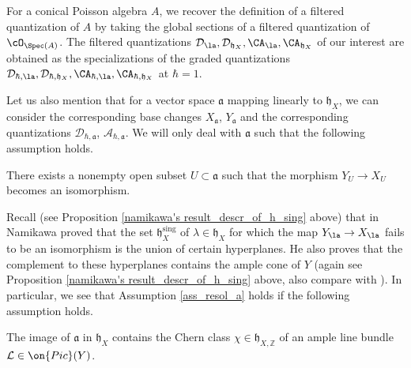 \documentclass[12pt]{amsart}
\begin{document}
For a conical Poisson algebra $A$, we recover the definition of a filtered quantization of $A$ by taking the global sections of a filtered quantization of $\cO_{\Spec(A)}$. The filtered quantizations $\mathcal{D}_\la, \mathcal{D}_{\mathfrak{h}_X}, \CA_\la, \CA_{\mathfrak{h}_X}$ of our interest are obtained as the specializations of the graded quantizations $\mathcal{D}_{\hbar, \la}, \mathcal{D}_{\hbar, \mathfrak{h}_X}, \CA_{\hbar, \la}, \CA_{\hbar, \mathfrak{h}_X}$ at $\hbar=1$. 




Let us also mention that for a vector space $\mathfrak{a}$ mapping linearly to $\mathfrak{h}_{X}$, we can consider the corresponding base changes $X_{\mathfrak{a}}$, $Y_{\mathfrak{a}}$ and the corresponding quantizations $\mathcal{D}_{\hbar,\mathfrak{a}}$, $\mathcal{A}_{\hbar,\mathfrak{a}}$. We will only deal with $\mathfrak{a}$ such that the following assumption holds.

\begin{assumption}\label{ass_resol_a}
There exists a nonempty open subset $U \subset \mathfrak{a}$ such that the morphism $Y_{U} \rightarrow X_{U}$ becomes an isomorphism. 
\end{assumption}



Recall (see Proposition \ref{namikawa's result_descr_of_h_sing} above) that in \cite[Main Theorem]{Namikawa_bir} Namikawa proved that the set $\mathfrak{h}_X^{\mathrm{sing}}$ of $\lambda \in \mathfrak{h}_X$ for which the map $Y_\la \rightarrow X_\la$ fails to be an isomorphism is the union of certain hyperplanes. He also proves that the complement to these hyperplanes contains the ample cone of $Y$ (again see Proposition \ref{namikawa's result_descr_of_h_sing} above, also compare with \cite[Lemma 2.5]{Kaledin2008}). In particular, we see that Assumption \ref{ass_resol_a} holds if the following assumption holds. 

\begin{assumption}\label{ass_ample_chern_a}
The image of $\mathfrak{a}$ in $\mathfrak{h}_X$ contains the Chern class $\chi \in \mathfrak{h}_{X,\mathbb{Z}}$ of an ample line bundle $\mathcal{L} \in \on{Pic}(Y)$.
\end{assumption}
\end{document}
